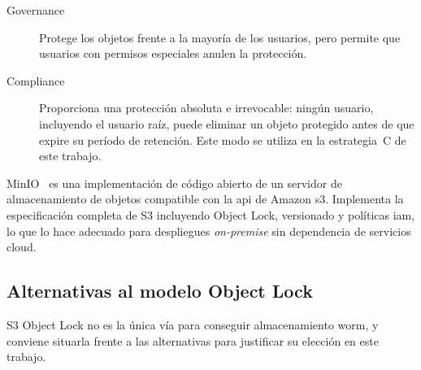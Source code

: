 \documentclass[../main.tex]{subfiles}
\begin{document}
\begin{description}
  \item[Governance] Protege los objetos frente a la mayoría de los usuarios,
  pero permite que usuarios con permisos especiales anulen la protección.

  \item[Compliance] Proporciona una protección absoluta e irrevocable: ningún
  usuario, incluyendo el usuario raíz, puede eliminar un objeto protegido
  antes de que expire su período de retención. Este modo se utiliza en la
  estrategia~C de este trabajo.
\end{description}

MinIO~\cite{minio2024} es una implementación de código abierto de un
servidor de almacenamiento de objetos compatible con la \gls{api} de
Amazon \gls{s3}. Implementa la especificación completa de S3 incluyendo
Object Lock, versionado y políticas \gls{iam}, lo que lo hace adecuado
para despliegues \textit{on-premise} sin dependencia de servicios cloud.

\subsection{Alternativas al modelo Object Lock}

S3 Object Lock no es la única vía para conseguir almacenamiento
\gls{worm}, y conviene situarla frente a las alternativas para justificar
su elección en este trabajo.
\end{document}
